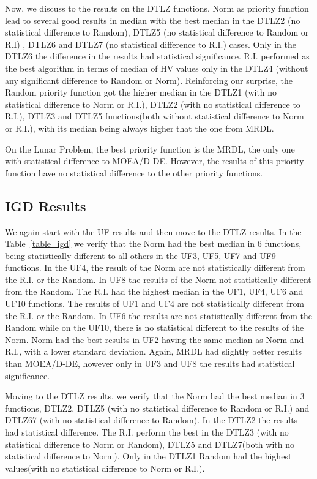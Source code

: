 Now, we discuss to the results on the DTLZ functions. Norm as priority function lead to several good results in median with the best median in the DTLZ2 (no statistical difference to Random), DTLZ5 (no statistical difference to Random or R.I) , DTLZ6 and DTLZ7 (no statistical difference to R.I.) cases. Only in the DTLZ6 the difference in the results had statistical significance. R.I. performed as the best algorithm in terms of median of HV values only in the DTLZ4 (without any significant difference to Random or Norm). Reinforcing our surprise, the Random priority function got the higher median in the DTLZ1 (with no statistical difference to Norm or R.I.), DTLZ2 (with no statistical difference to R.I.), DTLZ3 and DTLZ5 functions(both without statistical difference to Norm or R.I.), with its median being always higher that the one from MRDL. 

On the Lunar Problem, the best priority function is the MRDL, the only one with statistical difference to MOEA/D-DE. However, the results of this priority function have no statistical difference to the other priority functions.

\subsection{IGD Results}

We again start with the UF results and then move to the DTLZ results. In the Table~\ref{table_igd} we verify that the Norm had the best median in 6 functions, being statistically different to all others in the UF3, UF5, UF7 and UF9 functions. In the UF4, the result of the Norm are not statistically different from the R.I. or the Random. In UF8 the results of the Norm not statistically different from the Random. The R.I. had the highest median in the UF1, UF4, UF6 and UF10 functions. The results of UF1 and UF4 are not statistically different from the R.I. or the Random. In UF6 the results are not statistically different from the Random while on the UF10, there is no statistical different to the results of the Norm. Norm had the best results in UF2 having the same median as Norm and R.I., with a lower standard deviation. Again, MRDL had slightly better results than MOEA/D-DE, however only in UF3 and UF8 the results had statistical significance.

Moving to the DTLZ results, we verify that the Norm had the best median in 3 functions, DTLZ2, DTLZ5 (with no statistical difference to Random or R.I.) and DTLZ67 (with no statistical difference to Random). In the DTLZ2 the results had statistical difference. The R.I. perform the best in the DTLZ3 (with no statistical difference to Norm or Random), DTLZ5 and DTLZ7(both with no statistical difference to Norm). Only in the DTLZ1  Random had the highest values(with no statistical difference to Norm or R.I.).


